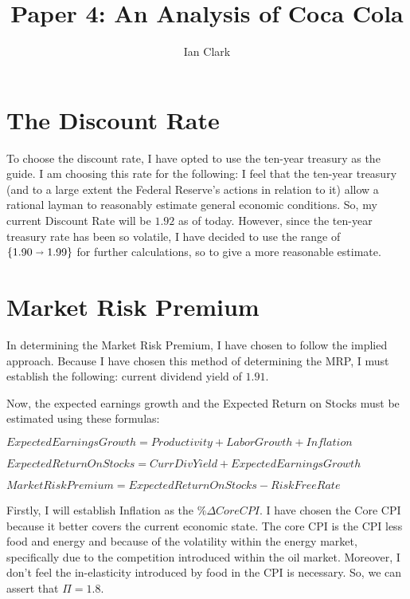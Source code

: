 \documentclass[11pt,letterpaper,english]{article}
\title{Paper 4: An Analysis of Coca Cola}
\author{Ian Clark}
\date{}
\newcommand{\newpar}{\vspace{10mm}\noindent}
\begin{document}
\maketitle

\section*{The Discount Rate}
To choose the discount rate, I have opted to use the ten-year treasury as the guide. I am choosing
this rate for the following: I feel that the ten-year treasury (and to a large extent the Federal
Reserve's actions in relation to it) allow a rational layman to reasonably estimate general economic
conditions. So, my current Discount Rate will be $1.92$ as of today. However, since the ten-year treasury
rate has been so volatile, I have decided to use the range of $\{1.90 \shortrightarrow 1.99\}$ for 
further calculations, so to give a more reasonable estimate.

\section*{Market Risk Premium}
In determining the Market Risk Premium, I have chosen to follow the implied approach. Because I have chosen
this method of determining the MRP, I must establish the following: current dividend yield of $1.91$.

\newpar
Now, the expected earnings growth and the Expected Return on Stocks must be estimated using these formulas:

\begin{center}
$Expected Earnings Growth = Productivity + Labor Growth + Inflation$
\end{center}

\begin{center}
$ExpectedReturnOnStocks = CurrDivYield + ExpectedEarningsGrowth$
\end{center}

\begin{center}
$MarketRiskPremium = ExpectedReturnOnStocks - RiskFreeRate$
\end{center}

\noindent
Firstly, I will establish Inflation as the $\%\Delta{Core CPI}$. I have chosen the Core CPI because
it better covers the current economic state. The core CPI is the CPI less food and energy and because
of the volatility within the energy market, specifically due to the competition introduced within the oil
market. Moreover, I don't feel the in-elasticity introduced by food in the CPI is necessary. So, we can 
assert that $\Pi = 1.8$. 
\end{document}
